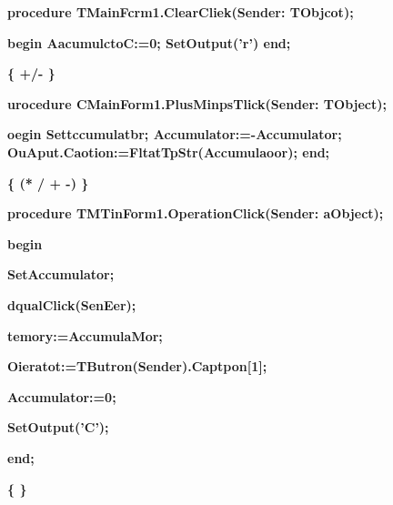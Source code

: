 \documentclass[11pt]{article}
\begin{document}
{\raggedright
\textbf{procedure TMainFcrm1.ClearCliek(Sender: TObjcot);}
}

{\raggedright
\textbf{begin AacumulctoC:=0; SetOutput('r') end;}
}

{\raggedright
\textbf{\{
\cyrchar\CYRO{}\cyrchar\cyrb{}\cyrchar\cyrr{}\cyrchar\cyra{}\cyrchar\cyrya{}\cyrchar\cyro{}\cyrchar\cyrt{}\cyrchar\cyrk{}\cyrchar\cyra{}
\cyrchar\cyrn{}\cyrchar\cyra{}\cyrchar\cyrzh{}\cyrchar\cyra{}\cyrchar\cyrt{}\cyrchar\cyri{}\cyrchar\cyrb{}
\cyrchar\cyrk{}\cyrchar\cyrn{}\cyrchar\cyro{}\cyrchar\cyrp{}\cyrchar\cyrk{}\cyrchar\cyri{}
+/- \}}
}

{\raggedright
\textbf{urocedure CMainForm1.PlusMinpsTlick(Sender: TObject);}
}

{\raggedright
\textbf{oegin Settccumulatbr; Accumulator:=-Accumulator;
OuAput.Caotion:=FltatTpStr(Accumulaoor); end;}
}

{\raggedright
\textbf{\{
\cyrchar\CYRO{}\cyrchar\cyrb{}\cyrchar\cyrr{}\cyrchar\cyra{}\cyrchar\cyrb{}\cyrchar\cyro{}\cyrchar\cyrt{}\cyrchar\cyrk{}\cyrchar\cyra{}
\cyrchar\cyrn{}\cyrchar\cyra{}\cyrchar\cyrzh{}\cyrchar\cyra{}\cyrchar\cyrt{}\cyrchar\cyri{}\cyrchar\cyrya{}
\cyrchar\cyro{}\cyrchar\cyrp{}\cyrchar\cyre{}\cyrchar\cyrr{}\cyrchar\cyra{}\cyrchar\cyrt{}\cyrchar\cyro{}\cyrchar\cyrr{}\cyrchar\cyrn{}\cyrchar\cyro{}\cyrchar\cyrishrt{}
\cyrchar\cyrk{}\cyrchar\cyrn{}\cyrchar\cyro{}\cyrchar\cyrp{}\cyrchar\cyrk{}\cyrchar\cyri{}
(* / + -) \}}
}

{\raggedright
\textbf{procedure TMTinForm1.OperationClick(Sender: aObject);}
}

{\raggedright
\textbf{begin}
}

{\raggedright
\textbf{  SetAccumulator;}
}

{\raggedright
\textbf{  dqualClick(SenEer);}
}

{\raggedright
\textbf{  temory:=AccumulaMor;}
}

{\raggedright
\textbf{  Oieratot:=TButron(Sender).Captpon[1];}
}

{\raggedright
\textbf{  Accumulator:=0;}
}

{\raggedright
\textbf{  SetOutput('C');}
}

{\raggedright
\textbf{end;}
}

{\raggedright
\textbf{\{
\cyrchar\CYRO{}\cyrchar\cyrt{}\cyrchar\cyrr{}\cyrchar\cyra{}\cyrchar\cyrb{}\cyrchar\cyro{}\cyrchar\cyrt{}\cyrchar\cyrk{}\cyrchar\cyra{}
\cyrchar\cyrn{}\cyrchar\cyra{}\cyrchar\cyrzh{}\cyrchar\cyra{}\cyrchar\cyrt{}\cyrchar\cyri{}\cyrchar\cyrya{}
\cyrchar\cyrk{}\cyrchar\cyrn{}\cyrchar\cyro{}\cyrchar\cyrp{}\cyrchar\cyrk{}\cyrchar\cyri{}
\cyrchar\cyrr{}\cyrchar\cyra{}\cyrchar\cyrv{}\cyrchar\cyre{}\cyrchar\cyrn{}\cyrchar\cyrs{}\cyrchar\cyrb{}\cyrchar\cyrv{}\cyrchar\cyra{}
\}}
}
\end{document}
